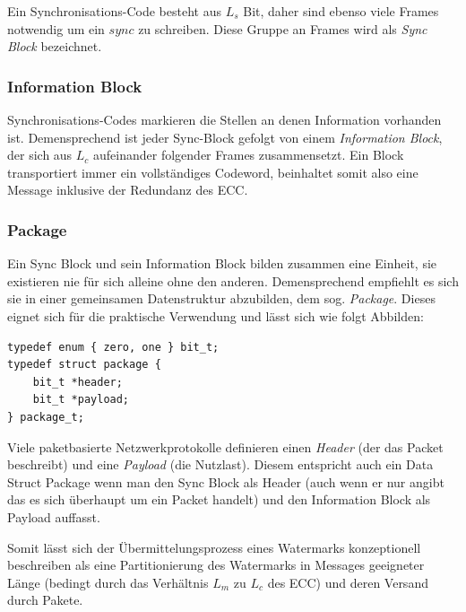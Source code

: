 Ein Synchronisations-Code besteht aus $L_s$ Bit, daher sind ebenso viele Frames notwendig um ein $sync$ zu schreiben. Diese Gruppe an Frames wird als \textit{Sync Block} bezeichnet.

\subsubsection{Information Block}
 
Synchronisations-Codes markieren die Stellen an denen Information vorhanden ist. Demensprechend ist jeder Sync-Block gefolgt von einem \textit{Information Block}, der sich aus $L_c$ aufeinander folgender Frames zusammensetzt. Ein Block transportiert immer ein vollständiges Codeword, beinhaltet somit also eine Message inklusive der Redundanz des ECC.

\subsubsection{Package}

Ein Sync Block und sein Information Block bilden zusammen eine Einheit, sie existieren nie für sich alleine ohne den anderen. Demensprechend empfiehlt es sich sie in einer gemeinsamen Datenstruktur abzubilden, dem sog. \textit{Package}. Dieses eignet sich für die praktische Verwendung und lässt sich wie folgt Abbilden:


\lstset{escapechar=@,style=customc}         
\begin{lstlisting}
typedef enum { zero, one } bit_t;
typedef struct package {
    bit_t *header;
    bit_t *payload; 
} package_t;
\end{lstlisting}

Viele paketbasierte Netzwerkprotokolle definieren einen \textit{Header} (der das Packet beschreibt) und eine \textit{Payload} (die \glqq{}Nutzlast\grqq{}). Diesem entspricht auch ein Data Struct Package wenn man den Sync Block als Header (auch wenn er nur angibt das es sich überhaupt um ein Packet handelt) und den Information Block als Payload auffasst.

Somit lässt sich der Übermittelungsprozess eines Watermarks konzeptionell beschreiben als eine Partitionierung des Watermarks in Messages geeigneter Länge (bedingt durch das Verhältnis $L_m$ zu $L_c$ des ECC) und deren Versand durch Pakete.


